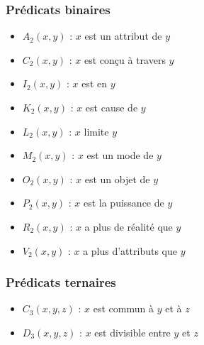 \documentclass[11pt,a4paper]{article}
\begin{document}
\subsubsection{Prédicats binaires}
\begin{itemize}
    \item $A_2(x,y)$ : $x$ est un attribut de $y$
    \item $C_2(x,y)$ : $x$ est conçu à travers $y$
    \item $I_2(x,y)$ : $x$ est en $y$
    \item $K_2(x,y)$ : $x$ est cause de $y$
    \item $L_2(x,y)$ : $x$ limite $y$
    \item $M_2(x,y)$ : $x$ est un mode de $y$
    \item $O_2(x,y)$ : $x$ est un objet de $y$
    \item $P_2(x,y)$ : $x$ est la puissance de $y$
    \item $R_2(x,y)$ : $x$ a plus de réalité que $y$
    \item $V_2(x,y)$ : $x$ a plus d'attributs que $y$
\end{itemize}

\subsubsection{Prédicats ternaires}
\begin{itemize}
    \item $C_3(x,y,z)$ : $x$ est commun à $y$ et à $z$
    \item $D_3(x,y,z)$ : $x$ est divisible entre $y$ et $z$
\end{itemize}
\end{document}

